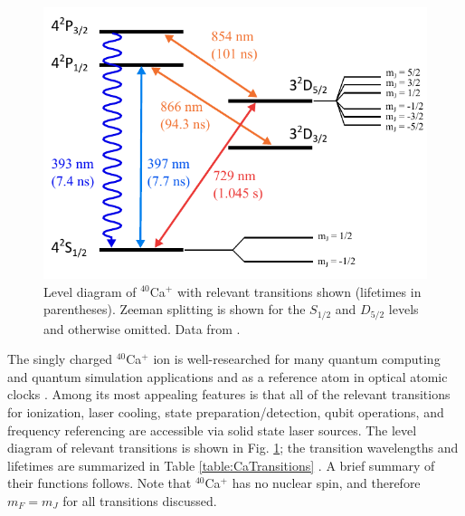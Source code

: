 \begin{figure}[t]
    \begin{center}
        \includegraphics{figures/2/Fig_CaSpec}
        \caption{\label{fig:CaSpec} Level diagram of $^{40}$Ca$^+$ with relevant transitions shown (lifetimes in parentheses). Zeeman splitting is shown for the $S_{1/2}$ and $D_{5/2}$ levels and otherwise omitted. Data from \cite{James98.APB.66.181}.   }
    \end{center}
\end{figure}

The singly charged $^{40}$Ca$^+$ ion is well-researched for many quantum computing and quantum simulation applications \cite{Roos00.Thesis, Häffner2008155, Blatt2012, Schmidt03.Nature.422.408} and as a reference atom in optical atomic clocks \cite{ RevModPhys.87.637, Champenois2004298}. Among its most appealing features is that all of the relevant transitions for ionization, laser cooling, state preparation/detection, qubit operations, and frequency referencing are accessible via solid state laser sources. The level diagram of relevant transitions is shown in Fig. \ref{fig:CaSpec}; the transition wavelengths and lifetimes are summarized in Table \ref{table:CaTransitions} \cite{James98.APB.66.181}. A brief summary of their functions follows. Note that $^{40}$Ca$^+$ has no nuclear spin, and therefore $m_F = m_J$ for all transitions discussed. %

